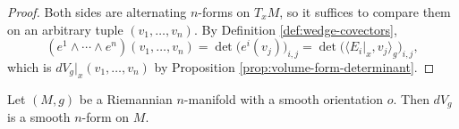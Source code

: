\begin{proof}
\leanok
{}
Both sides are alternating $n$-forms on $T_x M$, so it suffices to compare them on an arbitrary
tuple $(v_1, \ldots, v_n)$. By Definition \ref{def:wedge-covectors},
\[
(e^1 \wedge \cdots \wedge e^n)(v_1, \ldots, v_n)
  = \det \bigl( e^i(v_j) \bigr)_{i,j}
  = \det \bigl( \langle E_i|_x, v_j \rangle_g \bigr)_{i,j},
\]
which is $dV_g|_x(v_1, \ldots, v_n)$ by Proposition \ref{prop:volume-form-determinant}.
\end{proof}

\begin{proposition}
\label{prop:volume-form-smooth}
\leanok
{}
Let $(M,g)$ be a Riemannian $n$-manifold with a smooth orientation $o$. Then $dV_g$ is a smooth
$n$-form on $M$.
\end{proposition}

